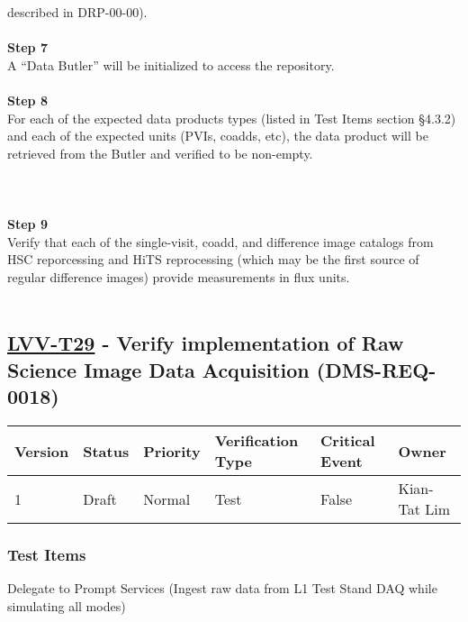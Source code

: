 described in DRP-00-00).\\
~\\
\textbf{Step 7}\\
A ``Data Butler'' will be initialized to access the repository.\\
~\\
\textbf{Step 8}\\
For each of the expected data products types (listed in Test Items
section §4.3.2) and each of the expected units (PVIs, coadds, etc), the
data product will be retrieved from the Butler and verified to be
non-empty.\\
~\\
~\\
~\\
\textbf{Step 9}\\
Verify that each of the single-visit, coadd, and difference image
catalogs from HSC reporcessing and HiTS reprocessing (which may be the
first source of regular difference images) provide measurements in flux
units.\\
~\\

\hypertarget{lvv-t29---verify-implementation-of-raw-science-image-data-acquisition-dms-req-0018}{%
\subsection{\texorpdfstring{\href{https://jira.lsstcorp.org/secure/Tests.jspa\#/testCase/LVV-T29}{LVV-T29}
- Verify implementation of Raw Science Image Data Acquisition
(DMS-REQ-0018)}{LVV-T29 - Verify implementation of Raw Science Image Data Acquisition (DMS-REQ-0018)}}\label{lvv-t29---verify-implementation-of-raw-science-image-data-acquisition-dms-req-0018}}

\begin{longtable}[]{@{}llllll@{}}
\toprule
Version & Status & Priority & Verification Type & Critical Event &
Owner\tabularnewline
\midrule
\endhead
1 & Draft & Normal & Test & False & Kian-Tat Lim\tabularnewline
\bottomrule
\end{longtable}

\hypertarget{test-items-118}{%
\subsubsection{Test Items}\label{test-items-118}}

Delegate to Prompt Services (Ingest raw data from L1 Test Stand DAQ
while simulating all modes)

